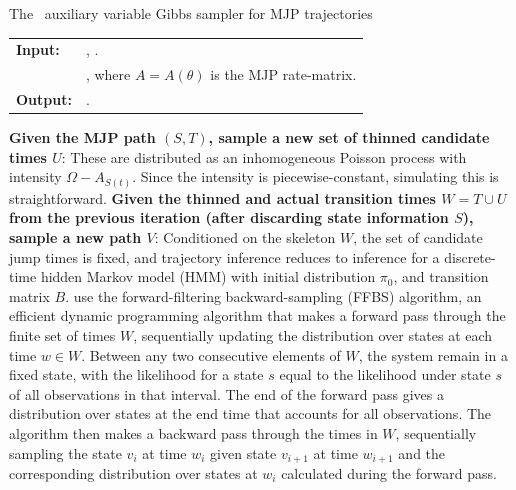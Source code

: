 \begin{algorithm}[H]
  \caption{The~\cite{RaoTeh13} auxiliary variable Gibbs sampler for MJP trajectories}
   \label{alg:Unif_gibbs}
  \begin{tabular}{l l}
   \textbf{Input:  } & \text{MJP parameters $\theta$, $\pi_0$, observations $X$}, 
                       \text{the previous path $S(t) = (S, T)$}.\\ 
                     & \text{A  parameter $\Omega > \max_i A_i$}, where
   $A = A(\theta)$ is the MJP rate-matrix.\\
   \textbf{Output:  }& \text{A new MJP trajectory $S' (t) = (S', T')$}.\\
   \hline
   \end{tabular}
   \begin{algorithmic}[1]
\State \textbf{Given the MJP path $(S,T)$, sample a new set of thinned 
candidate times $U$}: %
These are distributed as an inhomogeneous Poisson process with intensity 
$\Omega-A_{S(t)}$. Since the intensity is piecewise-constant, simulating 
this is straightforward.
\State \textbf{Given the thinned and actual transition times $W = T \cup U$
from the previous iteration (after discarding state information $S$), 
sample a new path $V$}:
    Conditioned on the skeleton $W$, the set of candidate jump
    times is fixed, and trajectory inference reduces to inference for
    a discrete-time hidden Markov model (HMM) with initial distribution
    $\pi_0$, and transition matrix $B$. \cite{RaoTeh13} use the forward-filtering
    backward-sampling (FFBS) algorithm, an efficient dynamic 
    programming algorithm that makes a forward pass through the
    finite set of times $W$, sequentially updating the 
    distribution over states at each time $w \in W$. 
    Between any two consecutive elements of $W$,
    the system remain in a fixed state, with the likelihood for a state $s$ equal
    to the likelihood under state $s$ of all observations 
    in that interval. 
    The end of the forward pass gives a distribution over states at the
    end time that accounts for all observations.
    The algorithm then makes a backward pass through the times in $W$, 
    sequentially sampling the state $v_i$ at time $w_i$ given state 
    $v_{i+1}$  at 
    time $w_{i+1}$ and the corresponding distribution over states 
    at $w_i$ calculated during the
    forward pass. 
\end{algorithmic}
\end{algorithm}

